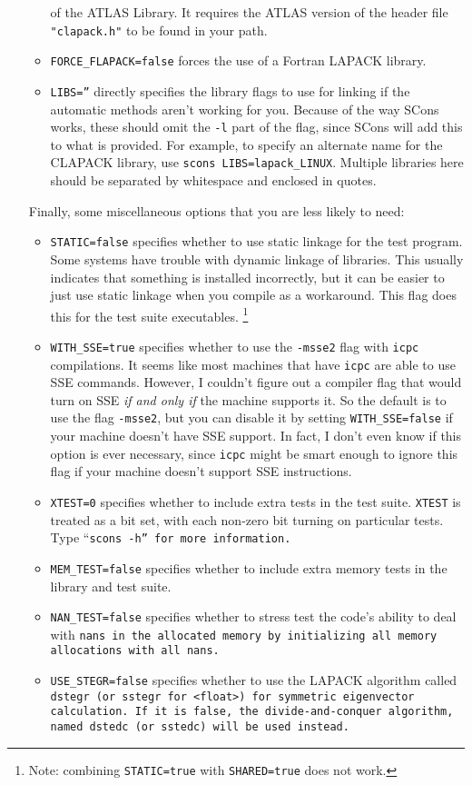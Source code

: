 \begin{enumerate}
\begin{itemize}
of the ATLAS Library.  
It requires the ATLAS version of the header file \texttt{"clapack.h"} to be found in your path.
\item \texttt{FORCE\_FLAPACK=false} forces the use of a Fortran LAPACK library.
\item \texttt{LIBS=''} directly specifies the library flags to use for linking if the automatic methods aren't working for you.  Because of the way SCons works,
these should omit the \texttt{-l} part of the flag, since SCons will add this to what is provided.
For example, to specify an alternate name for the CLAPACK library, use 
\texttt{scons LIBS=lapack\_LINUX}.  Multiple libraries here should be separated by 
whitespace and enclosed in quotes.
\end{itemize}
Finally, some miscellaneous options that you are less likely to need:
\begin{itemize}
\item \texttt{STATIC=false} specifies whether to use static linkage for the test program.  Some systems have trouble with
dynamic linkage of libraries.  This usually indicates that something is installed incorrectly, but
it can be easier to just use static linkage when you compile as a workaround.  This flag does this
for the test suite executables.  \footnote{Note: combining \texttt{STATIC=true} with \texttt{SHARED=true} does not work.}
\item \texttt{WITH\_SSE=true} specifies whether to use the \texttt{-msse2} flag with \texttt{icpc} compilations. 
It seems like most machines that have \texttt{icpc} are able to use SSE commands.  However, 
I couldn't figure out a compiler flag that would turn on SSE {\em if and only if} the machine
supports it.  So the default is to use the flag \texttt{-msse2}, but you can disable it by setting 
\texttt{WITH\_SSE=false} if your machine doesn't have SSE support.  In fact, I don't even know if this option is ever necessary, since \texttt{icpc} might be smart enough to ignore this flag if your machine doesn't support SSE instructions.
\item \texttt{XTEST=0} specifies whether to include extra tests in the test suite.  \texttt{XTEST}
is treated as a bit set, with each non-zero bit turning on particular tests.  Type ``\tt{scons -h}'' for 
more information.
\item \texttt{MEM\_TEST=false} specifies whether to include extra memory tests in the library and test suite.
\item \texttt{NAN\_TEST=false} specifies whether to stress test the code's ability to deal with \tt{nan}s in the allocated memory by initializing all memory allocations with all \tt{nan}s.
\item \texttt{USE\_STEGR=false} specifies whether to use the LAPACK algorithm called
\tt{dstegr} (or \tt{sstegr} for \tt{<float>}) for symmetric
eigenvector calculation.  If it is false, the divide-and-conquer algorithm,
named \tt{dstedc} (or \tt{sstedc}) will be used instead.


\end{itemize}
\end{enumerate}
